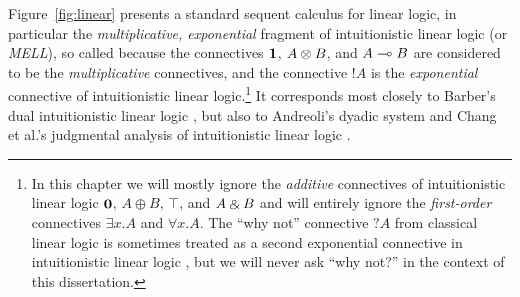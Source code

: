 

Figure~\ref{fig:linear} presents a standard sequent calculus for
linear logic, in particular the {\it multiplicative, exponential}
fragment of intuitionistic linear logic (or {\it MELL}), so called
because the connectives $\mathbf{1}$, $A \otimes B$, and $A \multimap B$ are
considered to be the {\it multiplicative} connectives, and the
connective ${!}A$ is the {\it exponential} connective of
intuitionistic linear logic.\footnote{In this chapter we will mostly
  ignore the {\it additive} connectives of intuitionistic linear logic
  $\mathbf{0}$, $A \oplus B$, $\top$, and $A \mathbin{\binampersand} B$ and will entirely
  ignore the {\it first-order} connectives $\exists x.A$ and $\forall
  x.A$. The ``why not'' connective $\mbox{?}A$ from classical linear
  logic is sometimes treated as a second exponential connective in
  intuitionistic linear logic \cite{chang03judgmental}, but we will
  never ask ``why not?'' in the context of this dissertation.} It
corresponds most closely to Barber's dual intuitionistic linear logic
\cite{barber96dual}, but also to Andreoli's dyadic system
\cite{andreoli92logic} and Chang et al.'s judgmental analysis of
intuitionistic linear logic \cite{chang03judgmental}.


